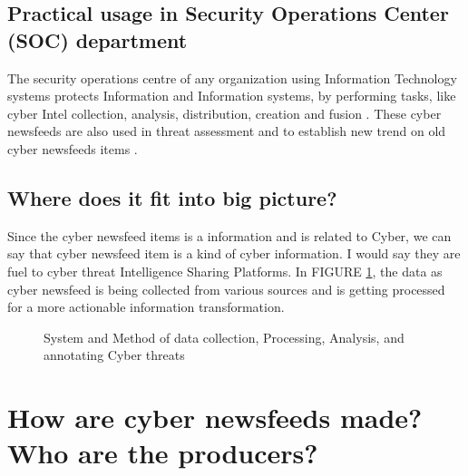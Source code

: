 \subsection{Practical usage in Security Operations Center
(SOC) department }

The security operations centre of any organization using Information Technology systems protects Information and Information systems, by performing tasks, like cyber Intel collection, analysis, distribution, creation and fusion
\citep{onwubiko2015cyber}. 
These cyber newsfeeds are also used in threat assessment and to establish new trend on old cyber newsfeeds items 
\citep{zimmerman2014ten}.

\subsection{Where does it fit into big picture?}

Since the cyber newsfeed items is a information and is related to Cyber, 
we can say that cyber newsfeed item is a kind of cyber information. 
I would say they are fuel to cyber threat
\citep[page 169]{RFC2828} Intelligence Sharing Platforms.  
In FIGURE \ref{fig:TIP-model}, 
the data as cyber newsfeed is being collected from various sources and 
is getting processed for a more actionable information transformation.

\begin{figure}
\centering
    \caption{System and Method of data collection, Processing, Analysis, and annotating Cyber threats \citep{edwards2002system}}
    \label{fig:TIP-model}
\end{figure}

\section{How are cyber newsfeeds made? Who are the producers?}

